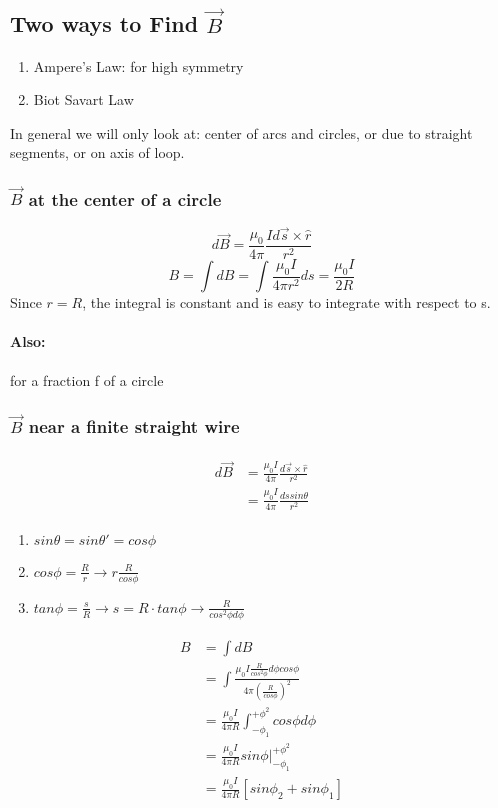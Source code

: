 \documentclass{article}
\begin{document}
    \subsection{Two ways to Find $\vec{B}$}
    \begin{enumerate}
        \item Ampere's Law: for high symmetry
        \item Biot Savart Law
    \end{enumerate}
    In general we will only look at: center of arcs and circles, or due to straight segments, or on axis of loop.
    \subsubsection{$\vec{B}$ at the center of a circle}
    $$d\vec{B} = \frac{\mu_0}{4\pi}\frac{Id\vec{s}\times \hat{r}}{r^2}$$
    $$B = \int dB = \int \frac{\mu_0 I}{4 \pi r^2}ds = \frac{\mu_0 I}{2R}$$
    Since $r=R$, the integral is constant and is easy to integrate with respect to s.
    \paragraph{Also:}for a fraction f of a circle 
    
    \subsubsection{$\vec{B}$ near a finite straight wire}
   
    \begin{align*}
        \begin{split}
            d\vec{B} &= \frac{\mu_0 I}{4\pi}\frac{d\vec{s}\times \hat{r}}{r^2}\\
                &= \frac{\mu_0 I}{4\pi} \frac{ds sin\theta}{r^2}
        \end{split}
    \end{align*}

    \begin{enumerate}
        \item $sin\theta = sin\theta ' =cos\phi$
        \item $cos\phi = \frac{R}{r} \rightarrow r \frac{R}{cos\phi}$
        \item $tan\phi = \frac{s}{R} \rightarrow s =R\cdot tan\phi \rightarrow \frac{R}{cos^2\phi d\phi}$
    \end{enumerate}

    \begin{align*}
        \begin{split}
            B &= \int dB \\
            &= \int \frac{\mu_0I \frac{R}{cos^2\phi}d\phi cos\phi}{4\pi (\frac{R}{cos\phi})^2} \\
            &= \frac{\mu_0 I}{4\pi R}\int_{-\phi_1}^{+\phi^2}cos\phi d\phi \\
            &= \frac{\mu_0 I}{4\pi R}sin \phi \rvert_{-\phi_1}^{+\phi^2} \\
            &= \frac{\mu_0 I}{4\pi R}[sin \phi _2 + sin\phi _1]
        \end{split}
    \end{align*}
\end{document}
